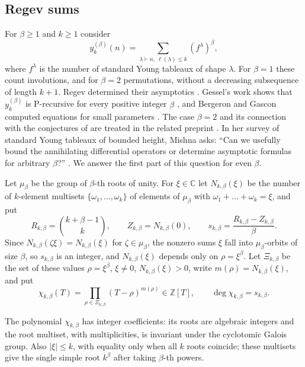 \documentclass[11pt]{amsart}
\theoremstyle{definition}
\newcommand{\C}{\mathbb C}
\newcommand{\Z}{\mathbb Z}
\begin{document}
\subsection{Regev sums}
For $\beta\ge1$ and $k\ge1$ consider
\[
y_{k}^{(\beta)}(n)=\sum_{\lambda\vdash n,\ \ell(\lambda)\le k}(f^\lambda)^\beta,
\]
where $f^\lambda$ is the number of standard Young tableaux of shape $\lambda$. For $\beta=1$ these count involutions, and for $\beta=2$ permutations, without a decreasing subsequence of length $k+1$. Regev determined their asymptotics \cite{Reg81}. Gessel's work shows that $y^{(\beta)}_k$ is P-recursive for every positive integer $\beta$ \cite{Ges90}, and Bergeron and Gascon computed equations for small parameters \cite{BG00}. The case $\beta=2$ and its connection with the conjectures of \cite{BFK95,BG00} are treated in the related preprint \cite{KBT}. In her survey of standard Young tableaux of bounded height, Mishna asks: ``Can we usefully bound the annihilating differential operators or determine asymptotic formulas for arbitrary $\beta$?'' \cite[\S4]{Mis19}. We answer the first part of this question for even $\beta$.

Let $\mu_\beta$ be the group of $\beta$-th roots of unity. For $\xi\in\C$ let $N_{k,\beta}(\xi)$ be the number of $k$-element multisets $\{\omega_1,\dots,\omega_k\}$ of elements of $\mu_\beta$ with $\omega_1+\dots+\omega_k=\xi$, and put
\[
R_{k,\beta}=\binom{k+\beta-1}{k},\qquad Z_{k,\beta}=N_{k,\beta}(0),\qquad s_{k,\beta}=\frac{R_{k,\beta}-Z_{k,\beta}}{\beta}.
\]
Since $N_{k,\beta}(\zeta\xi)=N_{k,\beta}(\xi)$ for $\zeta\in\mu_\beta$, the nonzero sums $\xi$ fall into $\mu_\beta$-orbits of size $\beta$, so $s_{k,\beta}$ is an integer, and $N_{k,\beta}(\xi)$ depends only on $\rho=\xi^\beta$. Let $\Xi_{k,\beta}$ be the set of these values $\rho=\xi^\beta$, $\xi\ne0$, $N_{k,\beta}(\xi)>0$, write $m(\rho)=N_{k,\beta}(\xi)$, and put
\[
\chi_{k,\beta}(T)=\prod_{\rho\in\Xi_{k,\beta}}(T-\rho)^{m(\rho)}\in\Z[T],\qquad\deg\chi_{k,\beta}=s_{k,\beta}.
\]

The polynomial $\chi_{k,\beta}$ has integer coefficients: its roots are
algebraic integers and the root multiset, with multiplicities, is invariant
under the cyclotomic Galois group.  Also $|\xi|\le k$, with equality only
when all $k$ roots coincide; these multisets give the single simple root
$k^\beta$ after taking $\beta$-th powers.
\end{document}
